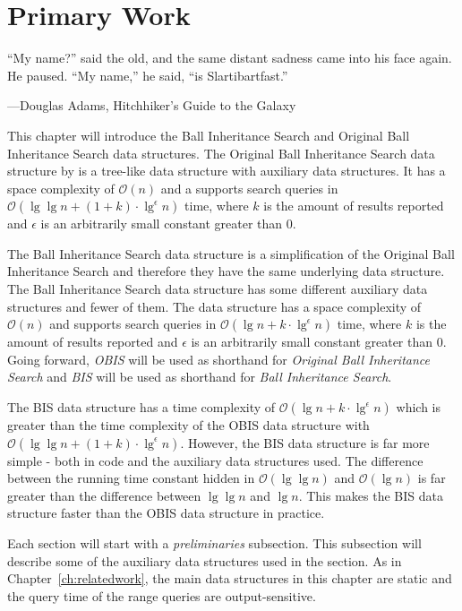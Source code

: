 \chapter{Primary Work}
\label{ch:primarywork}
\epigraph{``My name?'' said the old, and the same distant sadness came into his face again. He paused. ``My name,'' he said, ``is Slartibartfast.''}{---\textup{Douglas Adams}, Hitchhiker's Guide to the Galaxy}


This chapter will introduce the Ball Inheritance Search and Original Ball Inheritance Search data structures. The Original Ball Inheritance Search data structure by \citet{chanetal} is a tree-like data structure with auxiliary data structures. It has a space complexity of $\mathcal{O}(n)$ and a supports search queries in $\mathcal{O}(\lg\lg n + (1+k)\cdot\lg^\epsilon n)$ time, where $k$ is the amount of results reported and $\epsilon$ is an arbitrarily small constant greater than $0$.

The Ball Inheritance Search data structure is a simplification of the Original Ball Inheritance Search and therefore they have the same underlying data structure. The Ball Inheritance Search data structure has some different auxiliary data structures and fewer of them. The data structure has a space complexity of $\mathcal{O}(n)$ and supports search queries in $\mathcal{O}(\lg n + k\cdot\lg^\epsilon n)$ time, where $k$ is the amount of results reported and $\epsilon$ is an arbitrarily small constant greater than $0$. Going forward, \emph{OBIS} will be used as shorthand for \emph{Original Ball Inheritance Search} and \emph{BIS} will be used as shorthand for \emph{Ball Inheritance Search}.


The BIS data structure has a time complexity of $\mathcal{O}(\lg n + k\cdot \lg^\epsilon n)$ which is greater than the time complexity of the OBIS data structure with $\mathcal{O}(\lg \lg n + (1+k)\cdot \lg^\epsilon n)$. However, the BIS data structure is far more simple - both in code and the auxiliary data structures used. The difference between the running time constant hidden in $\mathcal{O}(\lg \lg n)$ and $\mathcal{O}(\lg n)$ is far greater than the difference between $\lg \lg n$ and $\lg n$. This makes the BIS data structure faster than the OBIS data structure in practice.

\vspace{4mm}

Each section will start with a \emph{preliminaries} subsection. This subsection will describe some of the auxiliary data structures used in the section. As in Chapter~\ref{ch:relatedwork}, the main data structures in this chapter are static and the query time of the range queries are output-sensitive.

